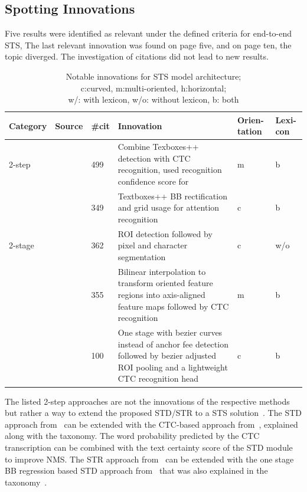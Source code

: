 \subsection{Spotting Innovations}
Five results were identified as relevant under the defined criteria for end-to-end \ac{STS},
The last relevant innovation was found on page five, and on page ten, the topic diverged.
The investigation of citations did not lead to new results.
\begin{table}[h]
    \centering\scriptsize
    \begin{tabular}{p{}p{}p{}p{}
            p{}p{}}
    \textbf{Category} & \textbf{Source} & \textbf{\#cit} & \textbf{Innovation} &
                                        \textbf{Orien-tation} & \textbf{Lexi-con} \\
        \toprule
        2-step &~\cite{liao_textboxes_2018} & 499 & Combine Texboxes++ detection with \ac{CTC}
            recognition, used recognition confidence score for & m & b\\
            &~\cite{shi_aster_2019} & 349 & Textboxes++ \ac{BB} rectification and grid usage for
                attention recognition & c & b \\
        2-stage &~\cite{lyu_mask_2018} & 362 & \ac{ROI} detection followed by pixel and character
            segmentation & c & w/o \\
            &~\cite{liu_fots_2018} & 355 & Bilinear interpolation to transform oriented feature
                regions into axis-aligned feature maps followed by \ac{CTC} recognition
                & m & b \\
            &~\cite{liu_abcnet_2020} & 100 & One stage with bezier curves instead of anchor fee
                detection followed by bezier adjusted ROI pooling and a lightweight \ac{CTC}
                recognition head & c & b  \\
        \bottomrule
    \end{tabular}
    \captionsetup{justification=centering}
    \caption[Notable innovations for STS model architecture]{%
        Notable innovations for STS model architecture; \\
        c:curved, m:multi-oriented, h:horizontal; \\
        w/: with lexicon, w/o: without lexicon, b: both\label{tb:E2E-steps-properties}
    }
\end{table}

The listed 2-step approaches are not the innovations of the respective methods but rather a
way to extend the proposed \ac{STD}/\ac{STR} to a \ac{STS}
solution~\citep{liao_textboxes_2018,shi_aster_2019}.
The \ac{STD} approach from~\cite{liao_textboxes_2018} can be extended with the \ac{CTC}-based
approach from~\cite{shi_end--end_2017}, explained along with the taxonomy.
The word probability predicted by the \ac{CTC} transcription can be combined with the
text certainty score of the \ac{STD} module to improve \ac{NMS}.
The \ac{STR} approach from~\cite{shi_aster_2019} can be extended with the one stage
\ac{BB} regression based \ac{STD} approach from~\cite{liao_textboxes_2017} that was also explained
in the taxonomy~\citep{shi_aster_2019}.

